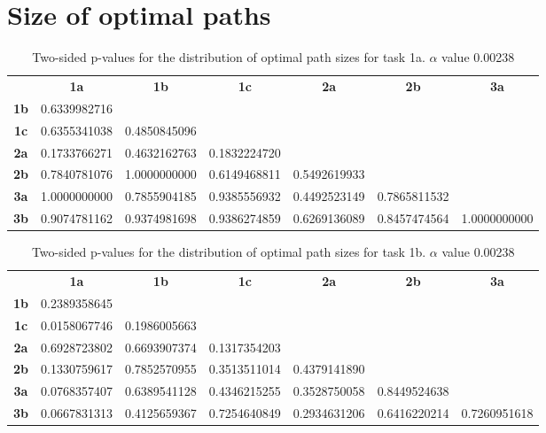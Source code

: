 \section{Size of optimal paths}
\label{appendix:ptable.pathsize}
\begin{table}[h!]
    \centering
    \begin{tabular}{ccccccc}
                & \textbf{1a}  & \textbf{1b}  & \textbf{1c}  & \textbf{2a}  & \textbf{2b}  & \textbf{3a}  \\
    \textbf{1b} & 0.6339982716 &              &              &              &              &              \\
    \textbf{1c} & 0.6355341038 & 0.4850845096 &              &              &              &              \\
    \textbf{2a} & 0.1733766271 & 0.4632162763 & 0.1832224720 &              &              &              \\
    \textbf{2b} & 0.7840781076 & 1.0000000000 & 0.6149468811 & 0.5492619933 &              &              \\
    \textbf{3a} & 1.0000000000 & 0.7855904185 & 0.9385556932 & 0.4492523149 & 0.7865811532 &              \\
    \textbf{3b} & 0.9074781162 & 0.9374981698 & 0.9386274859 & 0.6269136089 & 0.8457474564 & 1.0000000000
    \end{tabular}
    \caption[p-table for path sizes (task 1a)]{Two-sided p-values for the distribution of optimal path sizes for task 1a. \(\alpha\) value 0.00238}
    \label{tab:exp2.pathsize1a}
\end{table}

\begin{table}[h!]
    \centering
    \begin{tabular}{ccccccc}
                & \textbf{1a}  & \textbf{1b}  & \textbf{1c}  & \textbf{2a}  & \textbf{2b}  & \textbf{3a}  \\
    \textbf{1b} & 0.2389358645 &              &              &              &              &              \\
    \textbf{1c} & 0.0158067746 & 0.1986005663 &              &              &              &              \\
    \textbf{2a} & 0.6928723802 & 0.6693907374 & 0.1317354203 &              &              &              \\
    \textbf{2b} & 0.1330759617 & 0.7852570955 & 0.3513511014 & 0.4379141890 &              &              \\
    \textbf{3a} & 0.0768357407 & 0.6389541128 & 0.4346215255 & 0.3528750058 & 0.8449524638 &              \\
    \textbf{3b} & 0.0667831313 & 0.4125659367 & 0.7254640849 & 0.2934631206 & 0.6416220214 & 0.7260951618
    \end{tabular}
    \caption[p-table for path sizes (task 1b)]{Two-sided p-values for the distribution of optimal path sizes for task 1b. \(\alpha\) value 0.00238}
    \label{tab:exp2.pathsize1b}
\end{table}

